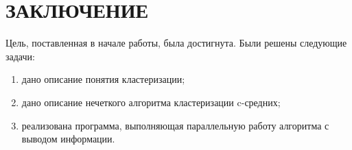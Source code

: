 \chapter*{ЗАКЛЮЧЕНИЕ}

Цель, поставленная в начале работы, была достигнута.
Были решены следующие задачи:
\begin{enumerate}
	\item дано описание понятия кластеризации;
	\item дано описание нечеткого алгоритма кластеризации c-средних;
	\item реализована программа, выполняющая параллельную работу алгоритма с выводом информации.
\end{enumerate}